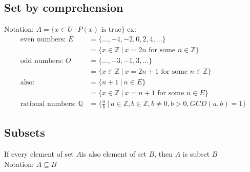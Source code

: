 \documentclass{article}
\begin{document}
\subsection{Set by comprehension}
Notation: $A = \{x \in U \ | \ P(x) \text{ is true}\}$
ex:
\begin{align*}
    \text{even numbers: } E              & = \{\ldots, -4, -2,0,2,4,\dots \}                                                                                      \\
                                         & = \{x \in \mathbb{Z} \ | \ x = 2n \text{ for some } n \in \mathbb{Z} \}                                                \\
    \text{odd numbers: } O               & = \{\dots,-3,-1,3,\dots \}                                                                                             \\
                                         & = \{x \in \mathbb{Z} \ | \ x = 2n+1 \text{ for some } n \in \mathbb{Z} \}                                              \\
    \text{also: }                        & =  \{n+1 \ | \ n \in E \}                                                                                              \\
                                         & = \{x \in \mathbb{Z} \ | \ x = n+1 \text{ for some } n \in E \}                                                        \\
    \text{rational numbers: } \mathbb{Q} & = \{\frac{a}{b} \ | \ a \in \mathbb{Z}, b \in                             \mathbb{Z}, b \neq 0, b > 0, GCD(a,b) = 1 \}
\end{align*}

\subsection{Subsets}
If every element of set $A$is also element of set $B$, then $A$ is subset $B$ \\
Notation: $A \subseteq B$
\end{document}
